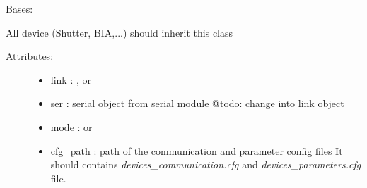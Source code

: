 \documentclass[letterpaper,10pt,english]{sphinxmanual}
\begin{document}
\begin{fulllineitems}
\label{enuActor.Devices:enuActor.Devices.Device.Device}
Bases: {\hyperref[enuActor:enuActor.QThread.QThread]{}}

All device (Shutter, BIA,...) should inherit this class
\begin{description}
\item[{Attributes:}] \leavevmode\begin{itemize}
\item {} 
link : ,  or 

\item {} 
ser : serial object from serial module @todo: change into link object

\item {} 
mode :  or 

\item {} 
cfg\_path : path of the communication and parameter config files                 It should contains \emph{devices\_communication.cfg} and                 \emph{devices\_parameters.cfg} file.

\end{itemize}

\end{description}

\begin{fulllineitems}
\label{enuActor.Devices:enuActor.Devices.Device.Device.available_link}
\end{fulllineitems}


\begin{fulllineitems}
\label{enuActor.Devices:enuActor.Devices.Device.Device.cfg_files}
\end{fulllineitems}


\begin{fulllineitems}
\label{enuActor.Devices:enuActor.Devices.Device.Device.fail}
\end{fulllineitems}


\end{fulllineitems}
\end{document}
